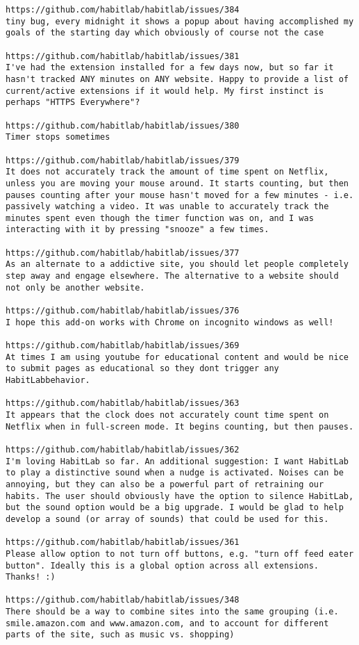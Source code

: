 \begin{lstlisting}[breaklines]
https://github.com/habitlab/habitlab/issues/384
tiny bug, every midnight it shows a popup about having accomplished my goals of the starting day which obviously of course not the case

https://github.com/habitlab/habitlab/issues/381
I've had the extension installed for a few days now, but so far it hasn't tracked ANY minutes on ANY website. Happy to provide a list of current/active extensions if it would help. My first instinct is perhaps "HTTPS Everywhere"?

https://github.com/habitlab/habitlab/issues/380
Timer stops sometimes

https://github.com/habitlab/habitlab/issues/379
It does not accurately track the amount of time spent on Netflix, unless you are moving your mouse around. It starts counting, but then pauses counting after your mouse hasn't moved for a few minutes - i.e. passively watching a video. It was unable to accurately track the minutes spent even though the timer function was on, and I was interacting with it by pressing "snooze" a few times.

https://github.com/habitlab/habitlab/issues/377
As an alternate to a addictive site, you should let people completely step away and engage elsewhere. The alternative to a website should not only be another website.

https://github.com/habitlab/habitlab/issues/376
I hope this add-on works with Chrome on incognito windows as well!

https://github.com/habitlab/habitlab/issues/369
At times I am using youtube for educational content and would be nice to submit pages as educational so they dont trigger any HabitLabbehavior.

https://github.com/habitlab/habitlab/issues/363
It appears that the clock does not accurately count time spent on Netflix when in full-screen mode. It begins counting, but then pauses.

https://github.com/habitlab/habitlab/issues/362
I'm loving HabitLab so far. An additional suggestion: I want HabitLab to play a distinctive sound when a nudge is activated. Noises can be annoying, but they can also be a powerful part of retraining our habits. The user should obviously have the option to silence HabitLab, but the sound option would be a big upgrade. I would be glad to help develop a sound (or array of sounds) that could be used for this.

https://github.com/habitlab/habitlab/issues/361
Please allow option to not turn off buttons, e.g. "turn off feed eater button". Ideally this is a global option across all extensions. Thanks! :)

https://github.com/habitlab/habitlab/issues/348
There should be a way to combine sites into the same grouping (i.e. smile.amazon.com and www.amazon.com, and to account for different parts of the site, such as music vs. shopping)

\end{lstlisting}
